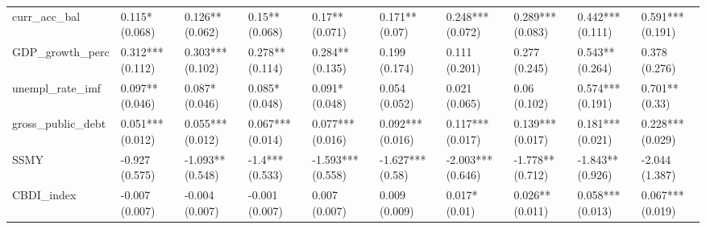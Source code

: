 \begin{table}[ht]
\begin{tabular}{llllllllll}
  curr\_acc\_bal & 0.115* (0.068) & 0.126** (0.062) & 0.15** (0.068) & 0.17** (0.071) & 0.171** (0.07) & 0.248*** (0.072) & 0.289*** (0.083) & 0.442*** (0.111) & 0.591*** (0.191) \\ 
  GDP\_growth\_perc & 0.312*** (0.112) & 0.303*** (0.102) & 0.278** (0.114) & 0.284** (0.135) & 0.199 (0.174) & 0.111 (0.201) & 0.277 (0.245) & 0.543** (0.264) & 0.378 (0.276) \\ 
  unempl\_rate\_imf & 0.097** (0.046) & 0.087* (0.046) & 0.085* (0.048) & 0.091* (0.048) & 0.054 (0.052) & 0.021 (0.065) & 0.06 (0.102) & 0.574*** (0.191) & 0.701** (0.33) \\ 
  gross\_public\_debt & 0.051*** (0.012) & 0.055*** (0.012) & 0.067*** (0.014) & 0.077*** (0.016) & 0.092*** (0.016) & 0.117*** (0.017) & 0.139*** (0.017) & 0.181*** (0.021) & 0.228*** (0.029) \\ 
  SSMY & -0.927 (0.575) & -1.093** (0.548) & -1.4*** (0.533) & -1.593*** (0.558) & -1.627*** (0.58) & -2.003*** (0.646) & -1.778** (0.712) & -1.843** (0.926) & -2.044 (1.387) \\ 
  CBDI\_index & -0.007 (0.007) & -0.004 (0.007) & -0.001 (0.007) & 0.007 (0.007) & 0.009 (0.009) & 0.017* (0.01) & 0.026** (0.011) & 0.058*** (0.013) & 0.067*** (0.019) \\ 
   \bottomrule
\end{tabular}
\endgroup
\end{table}
